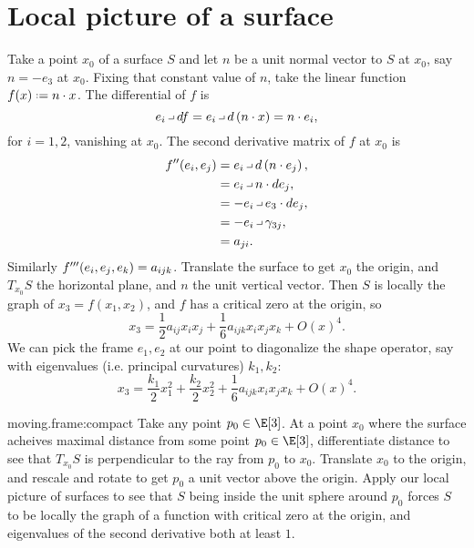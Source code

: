 \section{Local picture of a surface}
Take a point \(x_0\) of a surface \(S\) and let \(n\) be a unit normal vector to \(S\) at \(x_0\), say \(n=-e_3\) at \(x_0\).
Fixing that constant value of \(n\), take the linear function \(f(x) \defeq n\cdot x\).
The differential of \(f\) is
\[
e_i \hook df = e_i \hook d\pr{n \cdot x} = n \cdot e_i,
\]
for \(i=1,2\), vanishing at \(x_0\).
The second derivative matrix of \(f\) at \(x_0\) is
\begin{align*}
f''\of{e_i,e_j}
&=
e_i \hook d\pr{n \cdot e_j},
\\
&=
e_i \hook n \cdot de_j,
\\
&=
-e_i \hook e_3 \cdot de_j,
\\
&=
-e_i \hook \gamma_{3j},
\\
&=
a_{ji}.
\end{align*}
Similarly \(f'''\!\left(e_i,e_j,e_k\right)=a_{ijk}\).
Translate the surface to get \(x_0\) the origin, and \(T_{x_0} S\) the horizontal plane, and \(n\) the unit vertical vector.
Then \(S\) is locally the graph of \(x_3=f(x_1,x_2)\), and \(f\) has a critical zero at the origin, so
\[
x_3=\frac{1}{2}a_{ij}x_ix_j+\frac{1}{6}a_{ijk}x_ix_jx_k+O(x)^4.
\]
We can pick the frame \(e_1,e_2\) at our point to diagonalize the shape operator, say with eigenvalues (i.e. principal curvatures) \(k_1,k_2\):
\[
x_3=\frac{k_1}{2}x_1^2+\frac{k_2}{2}x_2^2+\frac{1}{6}a_{ijk}x_ix_jx_k+O(x)^4.
\]
\begin{answer}{moving.frame:compact}
Take any point \(p_0 \in \E[3]\).
At a point \(x_0\) where the surface acheives maximal distance from some point \(p_0\in\E[3]\), differentiate distance to see that \(T_{x_0} S\)  is perpendicular to the ray from \(p_0\) to \(x_0\).
Translate \(x_0\) to the origin, and rescale and rotate to get \(p_0\) a unit vector above the origin.
Apply our local picture of surfaces to see that \(S\) being inside the unit sphere around \(p_0\) forces \(S\) to be locally the graph of a function with critical zero at the origin, and eigenvalues of the second derivative both at least \(1\).
\end{answer}

